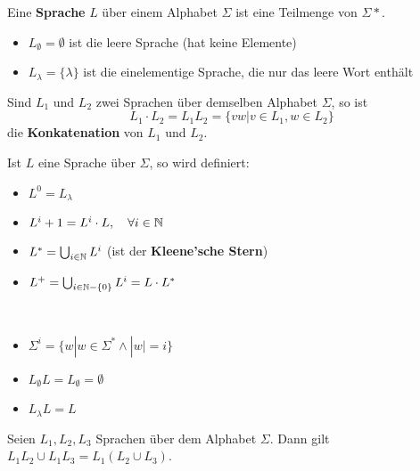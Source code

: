 \begin{definition}
Eine \textbf{Sprache} $L$ über einem Alphabet $\Sigma$ ist eine Teilmenge von $\Sigma*$.\\
\end{definition}

\begin{itemize}
  \item $L_\emptyset = \emptyset$ ist die leere Sprache (hat keine Elemente)
  \item $L_\lambda = \{\lambda\}$ ist die einelementige Sprache, die nur das leere Wort enthält\\
\end{itemize}

\begin{definition}
Sind $L_1$ und $L_2$ zwei Sprachen über demselben Alphabet $\Sigma$, so ist
\[
L_1 \cdot L_2 = L_1 L_2 = \{vw | v \in L_1, w \in L_2\}
\]
die \textbf{Konkatenation} von $L_1$ und $L_2$.\\
\end{definition}

\begin{definition}
Ist $L$ eine Sprache über $\Sigma$, so wird definiert:
\begin{itemize}
  \item $L^0 = L_\lambda$
  \item $L^i+1 = L^i \cdot L, \quad \forall i \in \mathbb{N}$
  \item $L^* = \bigcup_{i \in \mathbb{N}} L^i$ (ist der \textbf{Kleene'sche Stern})
  \item $L^+ = \bigcup_{i \in \mathbb{N} - \{0\}} L^i = L \cdot L^*$\\
\end{itemize}
\end{definition}

\begin{remark}
\
\begin{itemize}
  \item $\Sigma^i = \{w | w \in \Sigma^* \land |w| = i\}$
  \item $L_\emptyset L = L_\emptyset = \emptyset$
  \item $L_\lambda L = L$\\
\end{itemize}

\end{remark}

\begin{lemma}
Seien $L_1, L_2, L_3$ Sprachen über dem Alphabet $\Sigma$. Dann gilt $L_1 L_2 \cup L_1 L_3 = L_1 (L_2 \cup L_3)$.\\
\end{lemma}

